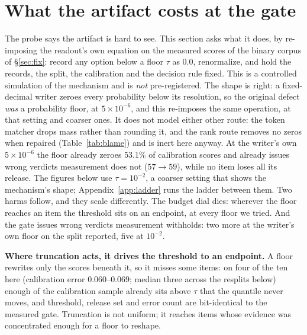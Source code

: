 \documentclass{article}
\newif\ifclaimtags\claimtagsfalse
\newcommand{\ct}[1]{\ifclaimtags\hfill{\scriptsize\textcolor{gray}{[#1]}}\fi}
\begin{document}
\section{What the artifact costs at the gate}\label{sec:cost}
The probe says the artifact is hard to see. This section asks what it does, by
re-imposing the readout's own equation on the measured scores of the binary
corpus of \S\ref{sec:fix}: record any option below a floor $\tau$ as $0.0$,
renormalize, and hold the records, the split, the calibration and the decision
rule fixed. This is a controlled simulation of the mechanism and is \emph{not}
pre-registered. The shape is right: a fixed-decimal writer zeroes
every probability below its resolution, so the original defect \emph{was} a
probability floor, at $5\times10^{-6}$, and this re-imposes the same operation, at that setting and coarser ones. It does not model either other route: the token matcher drops mass rather
than rounding it, and the rank route removes no zeros when repaired
(Table~\ref{tab:blame}) and is inert here anyway. At the writer's own $5\times10^{-6}$ the floor already zeroes $53.1\%$ of
calibration scores and already issues wrong verdicts measurement does not
($57 \to 59$), while no item loses all its release. The figures below use
$\tau = 10^{-2}$, a coarser setting that shows the mechanism's shape;
Appendix~\ref{app:ladder} runs the ladder between them. Two harms follow, and
they scale differently. The budget dial dies: wherever the floor reaches an item
the threshold sits on an endpoint, at every floor we tried. And the gate issues
wrong verdicts measurement withholds: two more at the writer's own floor on the
split reported, five at $10^{-2}$.\ct{C33, C46, C62, C70, C71, C81}

\textbf{Where truncation acts, it drives the threshold to an endpoint.} A floor rewrites only the scores beneath it, so it misses some items: on four of
the ten here (calibration error $0.060$--$0.069$; median three across the
resplits below) enough of the calibration sample
already sits above $\tau$ that the quantile never moves, and threshold, release
set and error count are bit-identical to the measured gate. Truncation is not uniform; it reaches items whose evidence was concentrated
enough for a floor to reshape.
\end{document}
